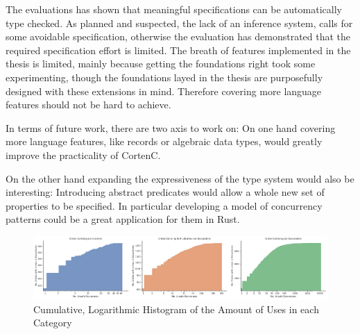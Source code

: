 \documentclass[twoside, english]{sdqthesis}
\theoremstyle{definition}
\begin{document}
The evaluations has shown that meaningful specifications can be automatically type checked. 
As planned and suspected, the lack of an inference system, calls for some avoidable specification, otherwise the evaluation has demonstrated that the required specification effort is limited.
The breath of features implemented in the thesis is limited, mainly because getting the foundations right took some experimenting, though the foundations layed in the thesis are purposefully designed with these extensions in mind. Therefore covering more language features should not be hard to achieve.


In terms of future work, there are two axis to work on: 
On one hand covering more language features, like records or algebraic data types, would greatly improve the practicality of CortenC. 

On the other hand expanding the expressiveness of the type system would also be interesting: Introducing abstract predicates would allow a whole new set of properties to be specified. In particular developing a model of concurrency patterns could be a great application for them in Rust.




\printbibliography[heading=bibintoc]

\appendix


\begin{figure}[h]
	\centering
	\includegraphics[width=0.99\linewidth, clip, trim={0.2cm 0.2cm 0.2cm 0.2cm}]{../unsafe-occurences-vs-no-crates.pdf}
	\caption{Cumulative, Logarithmic Histogram of the Amount of  Uses in each Category}
	\label{fig:unsafe-hist}
\end{figure}
\end{document}
